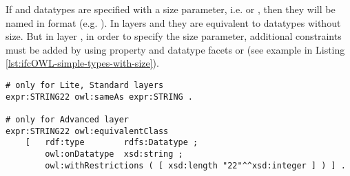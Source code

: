 \begin{ontologyRule}If  and  data\-types are specified with a size parameter, i.e.  or , then they will be named in format  (e.g. ). In layers \lite{} and \standard{} they are equivalent to data\-types without size. But in layer \advanced{}, in order to specify the size parameter, additional constraints must be added by using property  and data\-type facets  or  \cite{w3c:owl2-syntax,w3c:xmlschema11-2} (see example in Listing \ref{lst:ifcOWL-simple-types-with-size}).
\end{ontologyRule}

\begin{lstlisting}[caption={Size constraint of simple s},
label=lst:ifcOWL-simple-types-with-size]
# only for Lite, Standard layers
expr:STRING22 owl:sameAs expr:STRING .

# only for Advanced layer
expr:STRING22 owl:equivalentClass
    [   rdf:type        rdfs:Datatype ;
        owl:onDatatype  xsd:string ;
        owl:withRestrictions ( [ xsd:length "22"^^xsd:integer ] ) ] .
\end{lstlisting}












